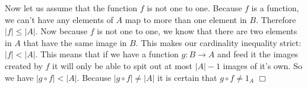 \documentclass[letterpaper]{article}
\begin{document}
\begin{enumerate}
\begin{enumerate}
Now let us assume that the function $f$ is not one to one. Because $f$ is a function, we can't have any elements of $A$ map to more than one element in $B$. Therefore $\left\lvert f\right\rvert\le \left\lvert A\right\rvert$. Now because $f$ is not one to one, we know that there are two elements in $A$ that have the same image in $B$. This makes our cardinality inequality strict: $\left\lvert f\right\rvert<\left\lvert A\right\rvert$. This means that if we have a function $g:B\to A$ and feed it the images created by $f$ it will only be able to spit out at most $\left\lvert A\right\rvert-1$ images of it's own. So we have $\left\lvert g\circ f\right\rvert<\left\lvert A\right\rvert$. Because $\left\lvert g\circ f\right\rvert\ne\left\lvert A\right\rvert$ it is certain that $g\circ f\ne1_A$
$\Box$
\end{enumerate}
\end{enumerate}
\end{document}
